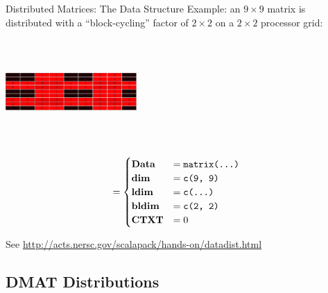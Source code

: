 \begin{frame}
  \begin{block}{Distributed Matrices:  The Data Structure}\pause
      Example:  an $9\times 9$ matrix is distributed with a ``block-cycling'' 
factor of $2\times 2$ on a $2\times 2$ processor grid:
      \begin{center}
      \begin{minipage}{.45\textwidth}
      \includegraphics[width=5cm, height=4cm]{../common/pics/dmat_dist}  
      \end{minipage}\hspace{.1cm}
      \begin{minipage}{.45\textwidth}
      \begin{center}
      \begin{align*}
        &=\begin{cases}
        $\textbf{Data}$ & =\text{\code{matrix(\dots)}}\\
        $\textbf{dim}$ & =\text{\code{c(9, 9)}}\\
        $\textbf{ldim}$ & =\text{\code{c(\dots)}}\\
        $\textbf{bldim}$ & =\text{\code{c(2, 2)}}\\
        $\textbf{CTXT}$ & =0
        \end{cases}
        \end{align*}
      \end{center}
      \end{minipage}
      \end{center}
    {\small See \url{http://acts.nersc.gov/scalapack/hands-on/datadist.html}}
  \end{block}
\end{frame}

  
  
  

\subsection{DMAT Distributions}





